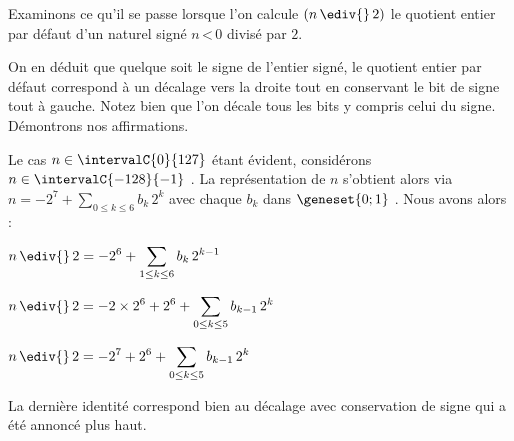 Examinons ce qu'il se passe lorsque l'on calcule  $(n\, \ediv{} \, 2)$ le quotient entier par défaut d'un naturel signé $n \,\text{<}\, 0$ divisé par $2$.


\medskip


\medskip


\medskip


On en déduit que quelque soit le signe de l'entier signé, le quotient entier par défaut correspond à un décalage vers la droite tout en conservant le bit de signe tout à gauche.
Notez bien que l'on décale tous les bits y compris celui du signe. Démontrons nos affirmations.

\medskip

Le cas $n \in \intervalC{0}{127}$ étant évident, considérons $n \in \intervalC{-128}{-1}$ .
La représentation de $n$ s'obtient alors via
$\displaystyle n = -2^7 + \sum_{0 \leq k \leq 6} b_k \, 2^k$ avec chaque $b_k$ dans $\geneset{0 ; 1}$ .
Nous avons alors :

\medskip

$\displaystyle n\, \ediv{} \, 2 
	= -2^6 + \sum_{1 \leq k \leq 6} b_k \, 2^{k-1}$

\smallskip

$\displaystyle n\, \ediv{} \, 2 
	= -2\times2^6 + 2^6 + \sum_{0 \leq k \leq 5} b_{k-1} \, 2^k$

\smallskip

$\displaystyle n\, \ediv{} \, 2 
	= -2^7 + 2^6 + \sum_{0 \leq k \leq 5} b_{k-1} \, 2^k$
	
\medskip

La dernière identité correspond bien au décalage avec conservation de signe qui a été annoncé plus haut.
